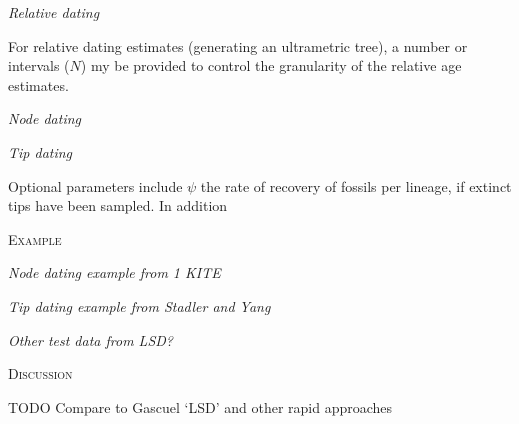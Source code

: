 \documentclass[12pt,letterpaper]{article}
\renewcommand{\section}[1]{%
\bigskip
\begin{center}
\begin{Large}
\normalfont\scshape #1
\medskip
\end{Large}
\end{center}}
\renewcommand{\subsection}[1]{%
\bigskip
\begin{center}
\begin{large}
\normalfont\itshape #1
\end{large}
\end{center}}
\begin{document}
\subsection{Relative dating}
For relative dating estimates (generating an ultrametric tree),
a number or intervals ($N$) my be provided to control the granularity of 
the relative age estimates.


\subsection{Node dating}

\subsection{Tip dating}
Optional parameters include $\psi$ the rate of recovery of fossils per lineage, 
if extinct tips have been sampled.
In addition


\section{Example}
\subsection{Node dating example from 1 KITE}

\subsection{Tip dating example from Stadler and Yang}

\subsection{Other test data from LSD?}

\section{Discussion}

TODO Compare to Gascuel `LSD' and other rapid approaches





\end{document}
